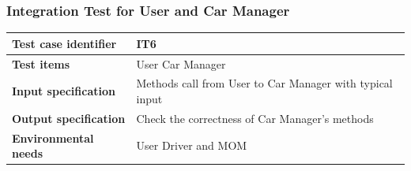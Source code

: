 \documentclass{article}
\begin{document}
			\subsubsection{Integration Test for User and Car Manager} \label{sec:3.1.4}
				\begin{minipage}{\linewidth}
				\end{minipage}
				\begin{center}
					\setlength{\tabcolsep}{24pt}
					\renewcommand{\arraystretch}{1.4}
					\begin{tabular}{ | l | p{8cm} |}\hline
						\textbf{Test case identifier} & IT6\\\hline
						\textbf{Test items} & User \textrightarrow Car Manager\\\hline
						\textbf{Input specification} & Methods call from User to Car Manager with typical input \\\hline
						\textbf{Output specification} & Check the correctness of Car Manager's methods \\\hline
						\textbf{Environmental needs} & User Driver and MOM\\\hline
					\end{tabular}
				\end{center}
				\pagebreak
\end{document}
